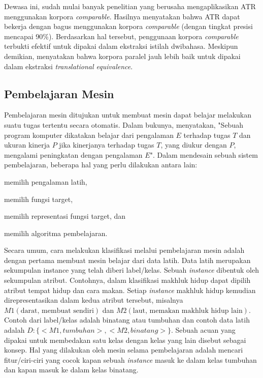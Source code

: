 \documentclass[../main/main.tex]{subfiles}
\begin{document}
Dewasa ini, sudah mulai banyak penelitian yang berusaha mengaplikasikan ATR menggunakan korpora \textit{comparable}. Hasilnya menyatakan bahwa ATR dapat bekerja dengan bagus menggunakan korpora \textit{comparable} (dengan tingkat presisi mencapai 90\%). Berdasarkan hal tersebut, penggunaan korpora \textit{comparable} terbukti efektif untuk dipakai dalam ekstraksi istilah dwibahasa. Meskipun demikian, \textcite{koehn} menyatakan bahwa korpora paralel jauh lebih baik untuk dipakai dalam ekstraksi \textit{translational equivalence}.

\subsection{Pembelajaran Mesin}
Pembelajaran mesin ditujukan untuk membuat mesin dapat belajar melakukan suatu tugas tertentu secara otomatis. Dalam bukunya, \textcite{mitchell} menyatakan, "Sebuah program komputer dikatakan belajar dari pengalaman $E$ terhadap tugas $T$ dan ukuran kinerja $P$ jika kinerjanya terhadap tugas $T$, yang diukur dengan $P$, mengalami peningkatan dengan pengalaman $E$". Dalam mendesain sebuah sistem pembelajaran, beberapa hal yang perlu dilakukan antara lain: \parencite{mitchell}
\begin{inparaenum}[(1)]
\item memilih pengalaman latih,
\item memilih fungsi target,
\item memilih representasi fungsi target, dan
\item memilih algoritma pembelajaran.
\end{inparaenum}

Secara umum, cara melakukan klasifikasi melalui pembelajaran mesin adalah dengan pertama membuat mesin belajar dari data latih. Data latih merupakan sekumpulan \gls{instance} yang telah diberi label/kelas. Sebuah \textit{instance} dibentuk oleh sekumpulan \gls{atribut}. Contohnya, dalam klasifikasi makhluk hidup dapat dipilih atribut tempat hidup dan cara makan. Setiap \textit{instance} makhluk hidup kemudian direpresentasikan dalam kedua atribut tersebut, misalnya $M1(\text{darat, membuat sendiri})$ dan $M2(\text{laut, memakan makhluk hidup lain})$. Contoh dari label/kelas adalah binatang atau tumbuhan dan contoh data latih adalah $D:\{<M1, tumbuhan>, <M2, binatang>\}$. Sebuah acuan yang dipakai untuk membedakan satu kelas dengan kelas yang lain disebut sebagai konsep. Hal yang dilakukan oleh mesin selama pembelajaran adalah mencari \gls{fitur}/ciri-ciri yang cocok kapan sebuah \textit{instance} masuk ke dalam kelas tumbuhan dan kapan masuk ke dalam kelas binatang.
\end{document}
